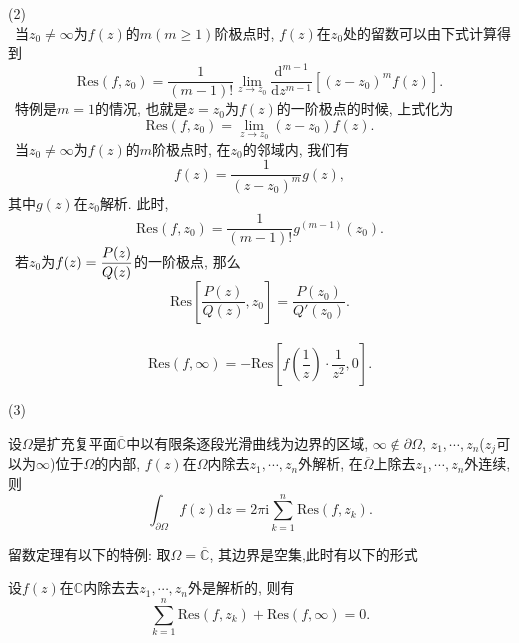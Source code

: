 	(2)\\	
	~当$z_0\neq\infty$为$f(z)$的$m(m\geqslant 1)$阶极点时, $f(z)$在$z_0$处的留数可以由下式计算得到
	\begin{equation*}
		\mathrm{Res}(f,z_0) = \frac{1}{(m-1)!}\lim\limits_{z\to z_0}\frac{\mathrm{d}^{m-1}}{\mathrm{d}z^{m-1}}\left[ (z-z_0)^mf(z) \right].
	\end{equation*}
	~特例是$m = 1$的情况, 也就是$z = z_0$为$f(z)$的一阶极点的时候, 上式化为
	\begin{equation*}
		\mathrm{Res}(f,z_0) = \lim\limits_{z\to z_0} (z-z_0)f(z).
	\end{equation*}
	~当$z_0\neq\infty$为$f(z)$的$m$阶极点时, 在$z_0$的邻域内, 我们有\begin{equation*}
		f(z) = \dfrac{1}{(z-z_0)^m}g(z),
	\end{equation*}
	其中$g(z)$在$z_0$解析. 此时,
	\begin{equation*}
		\mathrm{Res}(f,z_0) = \frac{1}{(m-1)!}g^{(m-1)}(z_0).
	\end{equation*}
	~若$z_0$为$\begin{lgathered}
		f(z) = \frac{P(z)}{Q(z)}
	\end{lgathered}$的一阶极点, 那么\begin{equation*}
		\mathrm{Res}\left[ \frac{P(z)}{Q(z)},z_0 \right] = \frac{P(z_0)}{Q'(z_0)}.
	\end{equation*}
	~\begin{equation*}
		\mathrm{Res}(f,\infty) = -\mathrm{Res}\left[ f\left(\frac{1}{z}\right)\cdot\frac{1}{z^2},0 \right].
	\end{equation*}
	
	(3)
	\begin{theorem}[留数定理]
		设$\Omega$是扩充复平面$\overline{\mathbb{C}}$中以有限条逐段光滑曲线为边界的区域, $\infty\notin\partial\Omega$, $z_1,\cdots,z_n$($z_j$可以为$\infty$)位于$\Omega$的内部, $f(z)$在$\Omega$内除去$z_1,\cdots,z_n$外解析, 在$\overline{\Omega}$上除去$z_1,\cdots,z_n$外连续, 则
		\begin{equation*}
			\int_{\partial\Omega}f(z)\mathrm{d}z = 2\pi\mathrm{i}\sum_{k=1}^n\mathrm{Res}(f,z_k).
		\end{equation*}
	\end{theorem}
	
	留数定理有以下的特例: 取$\Omega = \overline{\mathbb{C}}$, 其边界是空集,此时有以下的形式
	\begin{theorem}[留数定理的特例]
		设$f(z)$在$\mathbb{C}$内除去去$z_1,\cdots,z_n$外是解析的, 则有\begin{equation*}
			\sum_{k=1}^n\mathrm{Res}(f,z_k) + \mathrm{Res}(f,\infty) = 0. 
		\end{equation*}
	\end{theorem}
	
